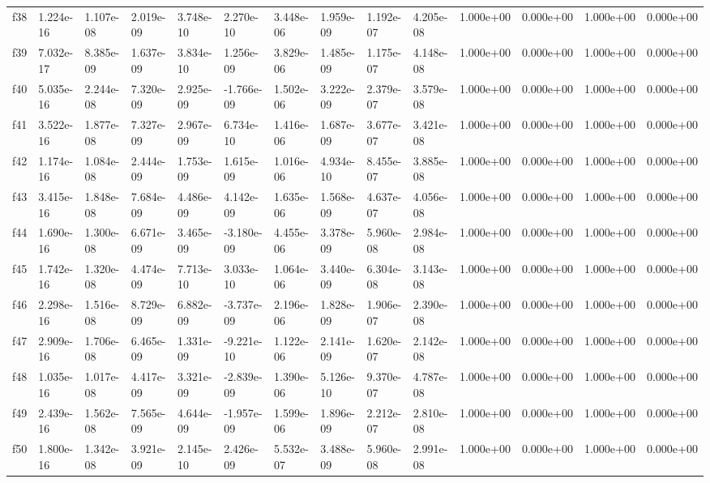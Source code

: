\begin{table}
\begin{tabular}{llllllllllllll}
f38 & 1.224e-16 & 1.107e-08 & 2.019e-09 & 3.748e-10 & 2.270e-10 & 3.448e-06 & 1.959e-09 & 1.192e-07 & 4.205e-08 & 1.000e+00 & 0.000e+00 & 1.000e+00 & 0.000e+00 \\
f39 & 7.032e-17 & 8.385e-09 & 1.637e-09 & 3.834e-10 & 1.256e-09 & 3.829e-06 & 1.485e-09 & 1.175e-07 & 4.148e-08 & 1.000e+00 & 0.000e+00 & 1.000e+00 & 0.000e+00 \\
f40 & 5.035e-16 & 2.244e-08 & 7.320e-09 & 2.925e-09 & -1.766e-09 & 1.502e-06 & 3.222e-09 & 2.379e-07 & 3.579e-08 & 1.000e+00 & 0.000e+00 & 1.000e+00 & 0.000e+00 \\
f41 & 3.522e-16 & 1.877e-08 & 7.327e-09 & 2.967e-09 & 6.734e-10 & 1.416e-06 & 1.687e-09 & 3.677e-07 & 3.421e-08 & 1.000e+00 & 0.000e+00 & 1.000e+00 & 0.000e+00 \\
f42 & 1.174e-16 & 1.084e-08 & 2.444e-09 & 1.753e-09 & 1.615e-09 & 1.016e-06 & 4.934e-10 & 8.455e-07 & 3.885e-08 & 1.000e+00 & 0.000e+00 & 1.000e+00 & 0.000e+00 \\
f43 & 3.415e-16 & 1.848e-08 & 7.684e-09 & 4.486e-09 & 4.142e-09 & 1.635e-06 & 1.568e-09 & 4.637e-07 & 4.056e-08 & 1.000e+00 & 0.000e+00 & 1.000e+00 & 0.000e+00 \\
f44 & 1.690e-16 & 1.300e-08 & 6.671e-09 & 3.465e-09 & -3.180e-09 & 4.455e-06 & 3.378e-09 & 5.960e-08 & 2.984e-08 & 1.000e+00 & 0.000e+00 & 1.000e+00 & 0.000e+00 \\
f45 & 1.742e-16 & 1.320e-08 & 4.474e-09 & 7.713e-10 & 3.033e-10 & 1.064e-06 & 3.440e-09 & 6.304e-08 & 3.143e-08 & 1.000e+00 & 0.000e+00 & 1.000e+00 & 0.000e+00 \\
f46 & 2.298e-16 & 1.516e-08 & 8.729e-09 & 6.882e-09 & -3.737e-09 & 2.196e-06 & 1.828e-09 & 1.906e-07 & 2.390e-08 & 1.000e+00 & 0.000e+00 & 1.000e+00 & 0.000e+00 \\
f47 & 2.909e-16 & 1.706e-08 & 6.465e-09 & 1.331e-09 & -9.221e-10 & 1.122e-06 & 2.141e-09 & 1.620e-07 & 2.142e-08 & 1.000e+00 & 0.000e+00 & 1.000e+00 & 0.000e+00 \\
f48 & 1.035e-16 & 1.017e-08 & 4.417e-09 & 3.321e-09 & -2.839e-09 & 1.390e-06 & 5.126e-10 & 9.370e-07 & 4.787e-08 & 1.000e+00 & 0.000e+00 & 1.000e+00 & 0.000e+00 \\
f49 & 2.439e-16 & 1.562e-08 & 7.565e-09 & 4.644e-09 & -1.957e-09 & 1.599e-06 & 1.896e-09 & 2.212e-07 & 2.810e-08 & 1.000e+00 & 0.000e+00 & 1.000e+00 & 0.000e+00 \\
f50 & 1.800e-16 & 1.342e-08 & 3.921e-09 & 2.145e-10 & 2.426e-09 & 5.532e-07 & 3.488e-09 & 5.960e-08 & 2.991e-08 & 1.000e+00 & 0.000e+00 & 1.000e+00 & 0.000e+00 \\

\end{tabular}
\end{table}
